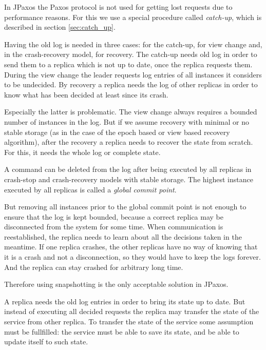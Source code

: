 In JPaxos the Paxos protocol is not used for getting lost requests due to performance reasons. For this we use a special procedure called \textit{catch-up}, which is described in section \ref{sec:catch_up}.

Having the old log is needed in three cases: for the catch-up, for view change and, in the crash-recovery model, for recovery.
The catch-up needs old log in order to send them to a replica which is not up to date, once the replica requests them.
During the view change the leader requests log entries of all instances it considers to be undecided.
By recovery a replica needs the log of other replicas in order to know what has been decided at least since its crash.

Especially the latter is problematic. The view change always requires a bounded number of instances in the log. But if we assume recovery with minimal or no stable storage (as in the case of the epoch based or view based recovery algorithm), after the recovery a replica needs to recover the state from scratch. For this, it needs the whole log or complete state.


A command can be deleted from the log after being executed by all replicas in crash-stop and crash-recovery models with stable storage. The highest instance executed by all replicas is called a \emph{global commit point}.

But removing all instances prior to the global commit point is not enough to ensure that the log is kept bounded, because a correct replica may be disconnected from the system for some time. When communication is reestablished, the replica needs to learn about all the decisions taken in the meantime. If one replica crashes, the other replicas have no way of knowing that it is a crash and not a disconnection, so they would have to keep the logs forever. And the replica can stay crashed for arbitrary long time.

Therefore using snapshotting is the only acceptable solution in JPaxos.


A replica needs the old log entries in order to bring its state up to date. But instead of executing all decided requests the replica may transfer the state of the service from other replica. To transfer the state of the service some assumption must be fullfilled: the service must be able to save its state, and be able to update itself to such state.

